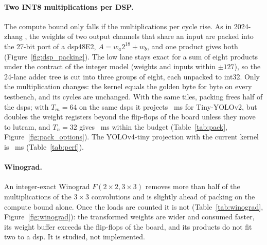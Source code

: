 \documentclass[11pt,a4paper]{article}
\begin{document}

\paragraph{Two INT8 multiplications per DSP.} The compute bound only falls if the
multiplications per cycle rise. As in 2024-zhang \cite[\#008.0]{2024-zhang}, the weights of
two output channels that share an input are packed into the 27-bit port of a \gls{dsp}48E2,
$A = w_a 2^{18} + w_b$, and one product gives both (Figure~\ref{fig:dsp_packing}). The low
lane stays exact for a sum of eight products under the contract of the integer model
(weights and inputs within $\pm127$), so the 24-lane adder tree is cut into three groups of
eight, each unpacked to int32. Only the multiplication changes: the  kernel equals
the \gls{golden} byte for byte on every testbench, and its cycles are unchanged. With the same
\glspl{tile}, packing frees half of the \glspl{dsp}; with $T_m=64$ on the same \glspl{dsp} it projects
~ms for Tiny-YOLOv2, but doubles the weight registers beyond the
flip-flops of the board unless they move to \gls{lutram}, and $T_n=32$ gives
~ms within the budget (Table~\ref{tab:pack},
Figure~\ref{fig:pack_options}). The YOLOv4-tiny projection with the current kernel is
~ms (Table~\ref{tab:perf}).

\begin{table}[htbp]
\caption{Packed \gls{pe} options, accelerator only, KV260 at 200~MHz
().}
\label{tab:pack}
\footnotesize{}
\end{table}


\paragraph{Winograd.} An integer-exact Winograd $F(2\times2, 3\times3)$ removes more than half
of the multiplications of the $3\times3$ convolutions \cite[\#036.1]{2023-zhai} and is
slightly ahead of packing on the compute bound alone. Once the loads are counted it is not
(Table~\ref{tab:winograd}, Figure~\ref{fig:winograd}): the transformed weights are wider and
consumed faster, its weight buffer exceeds the flip-flops of the board, and its products do
not fit two to a \gls{dsp}. It is studied, not implemented.
\end{document}

